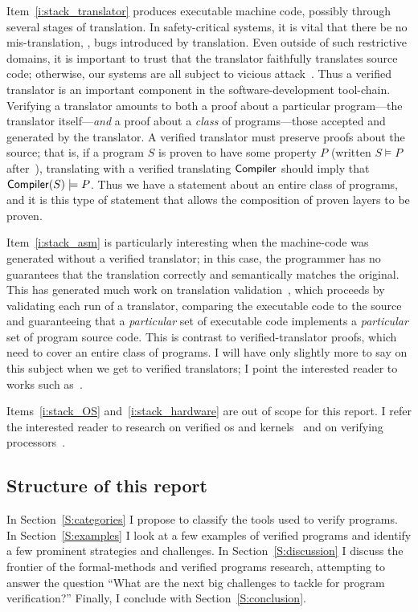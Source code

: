 Item~\ref{i:stack_translator} produces executable machine code, possibly through
several stages of translation. In safety-critical systems, it is vital that
there be no mis-translation, \ie, bugs introduced by translation. Even outside
of such restrictive domains, it is important to trust that the translator
faithfully translates source code; otherwise, our systems are all subject to
vicious attack~\cite{Thompson_1984}. Thus a verified translator is an important
component in the software-development tool-chain. Verifying a translator amounts
to both a proof about a particular program---the translator itself---\emph{and}
a proof about a \emph{class} of programs---those accepted and generated by the
translator. A verified translator must preserve proofs about the source; that
is, if a program \(S\) is proven to have some property \(P\) (written \(S
\models P\) after~\cite{Leroy-Compcert-CACM}), translating with a verified
translating \(\mathsf{Compiler}\) should imply that \(\mathsf{Compiler}(S) \models
P\). Thus we have a statement about an entire class of programs, and it is this
type of statement that allows the composition of proven layers to be proven.

Item~\ref{i:stack_asm} is particularly interesting when the machine-code was
generated without a verified translator; in this case, the programmer has no
guarantees that the translation correctly and semantically matches the original.
This has generated much work on translation validation~\cite{Pnueli_1998}, which
proceeds by validating each run of a translator, comparing the executable code
to the source and guaranteeing that a \emph{particular} set of executable code
implements a \emph{particular} set of program source code. This is contrast to
verified-translator proofs, which need to cover an entire class of programs. I
will have only slightly more to say on this subject when we get to verified
translators; I point the interested reader to works such
as~\cite{Sewell:phd,Sewell_KH_16,Sewell_2013,Necula_2000}.

Items~\ref{i:stack_OS} and~\ref{i:stack_hardware} are out of scope for this
report. I refer the interested reader to research on verified \gls{os} and
kernels~\cite{Klein_EHACDEEKNSTW_09,Klein_AEHCDEEKNSTW_10,Klein_AEMSKH_14,Sewell_KH_16,Narayanan_2019,Narayan_2020,Nelson_2017}
and on verifying
processors~\cite{sturton-memocode13,Sturton_2013,Bradfield_2016,zhang2017identifying,zhang2018recursive,zhang2018end}.

\subsection{Structure of this report}

In Section~\ref{S:categories} I propose to classify the tools used to verify
programs. In Section~\ref{S:examples} I look at a few examples of verified
programs and identify a few prominent strategies and challenges. In
Section~\ref{S:discussion} I discuss the frontier of the formal-methods and
verified programs research, attempting to answer the question ``What are the
next big challenges to tackle for program verification?'' Finally, I conclude
with Section~\ref{S:conclusion}.
